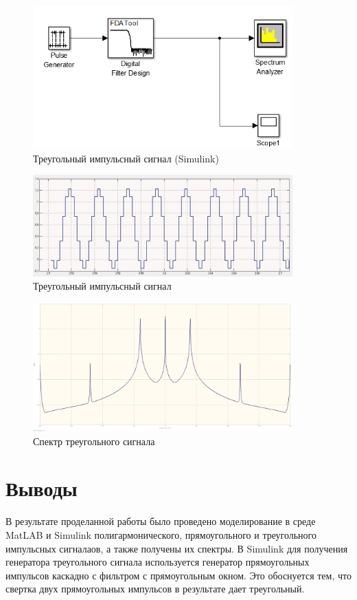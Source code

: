 \begin{figure}[H]
\centering
\includegraphics[width=10cm]{lab5/4_simulink} 
\caption{Треугольный импульсный сигнал (Simulink)} 
\end{figure}

\begin{figure}[H]
\centering
\includegraphics[width=10cm]{lab5/lab5_5_simulink} 
\caption{Треугольный импульсный сигнал} 
\end{figure}

\begin{figure}[H]
\centering
\includegraphics[width=10cm]{lab5/lab5_6_simulink}
\caption{Спектр треугольного сигнала} 
\end{figure}

\section{Выводы}
В результате проделанной работы было проведено моделирование в среде MatLAB и Simulink полигармонического, прямоугольного и треугольного импульсных сигналаов, а также получены их спектры. В Simulink для получения генератора треугольного сигнала используется генератор прямоугольных импульсов каскадно с фильтром с прямоугольным окном. Это обоснуется тем, что свертка двух прямоугольных импульсов в результате дает треугольный.